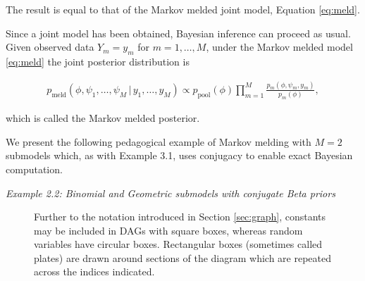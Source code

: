 \documentclass[11pt,]{book}
\begin{document}
The result is equal to that of the Markov melded joint model, Equation
\eqref{eq:meld}.

Since a joint model has been obtained, Bayesian inference can proceed as
usual. Given observed data \(Y_m = y_m\) for \(m = 1, \ldots, M\), under
the Markov melded model \eqref{eq:meld} the joint posterior distribution
is

\begin{align}
p_{\text{meld}}(\phi, \psi_1, \ldots, \psi_M \, | \, y_1, \ldots, y_M) \propto p_{\text{pool}}(\phi) \prod_{m=1}^{M} \frac{p_m(\phi, \psi_m, y_m)}{p_m(\phi)}, \label{eq:meldpost}
\end{align}

which is called the Markov melded posterior.

We present the following pedagogical example of Markov melding with
\(M = 2\) submodels which, as with Example 3.1, uses conjugacy to enable
exact Bayesian computation.

\emph{Example 2.2: Binomial and Geometric submodels with conjugate Beta
priors}

\begin{figure}
\centering
{}
\caption{Further to the notation introduced in Section \ref{sec:graph}, constants may be included in DAGs with square boxes, whereas random variables have circular boxes. Rectangular boxes (sometimes called plates) are drawn around sections of the diagram which are repeated across the indices indicated.}
\label{fig:ex1dag}
\end{figure}
\end{document}
